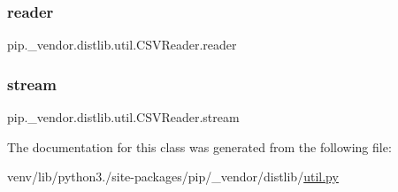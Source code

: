 \subsubsection{\texorpdfstring{reader}{reader}}
{\footnotesize\ttfamily pip.\+\_\+vendor.\+distlib.\+util.\+C\+S\+V\+Reader.\+reader}

\mbox{\label{classpip_1_1__vendor_1_1distlib_1_1util_1_1CSVReader_a18318328ab4659c139c9340139603268}} 
\subsubsection{\texorpdfstring{stream}{stream}}
{\footnotesize\ttfamily pip.\+\_\+vendor.\+distlib.\+util.\+C\+S\+V\+Reader.\+stream}



The documentation for this class was generated from the following file\+:\begin{DoxyCompactItemize}
\item 
venv/lib/python3./site-\/packages/pip/\+\_\+vendor/distlib/\hyperlink{pip_2__vendor_2distlib_2util_8py}{util.\+py}\end{DoxyCompactItemize}
